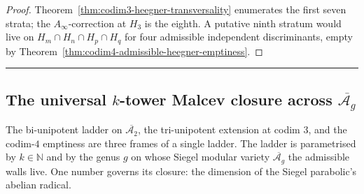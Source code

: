 \begin{proof}
Theorem~\textup{\ref{thm:codim3-heegner-transversality}} enumerates
the first seven strata; the $A_\infty$-correction at $H_3$ is the
eighth. A putative ninth stratum would live on
$H_m\cap H_n\cap H_p\cap H_q$ for four admissible independent
discriminants, empty by
Theorem~\textup{\ref{thm:codim4-admissible-heegner-emptiness}}.
\end{proof}

\begin{center}
\rule{0.3\textwidth}{0.4pt}
\end{center}

\subsection{The universal \texorpdfstring{$k$}{k}-tower Malcev closure
 across \texorpdfstring{$\overline{\mathcal A_g}$}{bar A\_g}}
\label{subsec:universal-k-tower-malcev-closure}

The bi-unipotent ladder on $\overline{\mathcal A_2}$, the
tri-unipotent extension at codim $3$, and the codim-$4$ emptiness
are three frames of a single ladder. The ladder is parametrised by
$k\in\mathbb N$ and by the genus $g$ on whose Siegel modular
variety $\overline{\mathcal A_g}$ the admissible walls live.
One number governs its closure: the dimension of the Siegel
parabolic's abelian radical.

